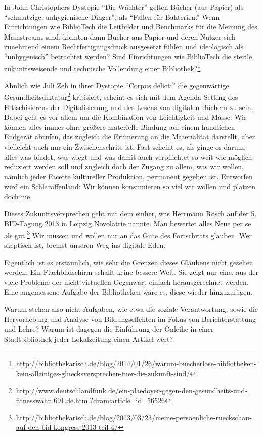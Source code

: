 \documentclass[a4paper,
fontsize=11pt,
oneside,
numbers=noperiodatend,
parskip=half-,
bibliography=totoc,
final
]{scrartcl}
\begin{document}
In John Christophers Dystopie \enquote{Die Wächter} gelten Bücher (aus
Papier) als \enquote{schmutzige, unhygienische Dinger}, als
\enquote{Fallen für Bakterien.} Wenn Einrichtungen wie BiblioTech die
Leitbilder und Benchmarks für die Meinung des Mainstreams sind, könnten
dann Bücher aus Papier und deren Nutzer sich zunehmend einem
Rechtfertigungsdruck ausgesetzt fühlen und ideologisch als
\enquote{unhygenisch} betrachtet werden? Sind Einrichtungen wie
BiblioTech die sterile, zukunftsweisende und technische Vollendung einer
Bibliothek?\footnote{\url{http://bibliothekarisch.de/blog/2014/01/26/warum-buecherlose-bibliotheken-kein-alleiniges-gluecksversprechen-fuer-die-zukunft-sind/}}

Ähnlich wie Juli Zeh in ihrer Dystopie \enquote{Corpus delicti} die
gegenwärtige Gesundheitsdiktatur\footnote{\url{http://www.deutschlandfunk.de/ein-plaedoyer-gegen-den-gesundheits-und-fitnesswahn.691.de.html?dram:article\_id=56526}}
kritisiert, scheint es sich mit dem Agenda Setting des Fetischisierens
der Digitalisierung und des Lesens von digitalen Büchern zu sein. Dabei
geht es vor allem um die Kombination von Leichtigkeit und Masse: Wir
können alles immer ohne größere materielle Bindung auf einem handlichen
Endgerät abrufen, das zugleich die Erinnerung an die Materialität
darstellt, aber vielleicht auch nur ein Zwischenschritt ist. Fast
scheint es, als ginge es darum, alles was bindet, was wiegt und was
damit auch verpflichtet so weit wie möglich reduziert werden soll und
zugleich doch der Zugang zu allem, was wir wollen, nämlich jeder Facette
kultureller Produktion, permanent gegeben ist. Entworfen wird ein
Schlaraffenland: Wir können konsumieren so viel wir wollen und platzen
doch nie.

Dieses Zukunftsversprechen geht mit dem einher, was Herrmann Rösch auf
der 5. BID-Tagung 2013 in Leipzig Novolatrie nannte. Man bewertet alles
Neue per se als gut.\footnote{\url{http://bibliothekarisch.de/blog/2013/03/23/meine-persoenliche-rueckschau-auf-den-bid-kongress-2013-teil-4/}}
Wir müssen und wollen nur an das Gute des Fortschritts glauben. Wer
skeptisch ist, bremst unseren Weg ins digitale Eden.

Eigentlich ist es erstaunlich, wie sehr die Grenzen dieses Glaubens
nicht gesehen werden. Ein Flachbildschirm schafft keine bessere Welt.
Sie zeigt nur eine, aus der viele Probleme der nicht-virtuellen
Gegenwart einfach herausgerechnet werden. Eine angemessene Aufgabe der
Bibliotheken wäre es, diese wieder hinzuzufügen.

Warum stehen also nicht Aufgaben, wie etwa die soziale Verantwortung,
sowie die Hervorhebung und Analyse von Bildungseffekten im Fokus von
Berichterstattung und Lehre? Warum ist dagegen die Einführung der
Onleihe in einer Stadtbibliothek jeder Lokalzeitung einen Artikel wert?
\end{document}
